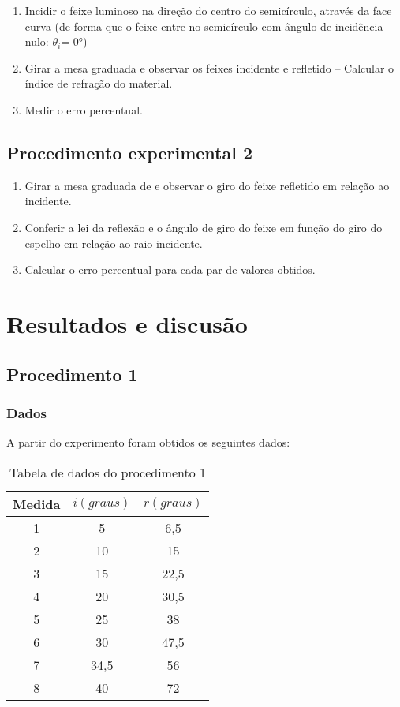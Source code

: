 \documentclass [a4paper, 12pt]{article}
\begin{document}
\begin{enumerate}
    \item Incidir o feixe luminoso na direção do centro do semicírculo, através da face curva (de forma que o feixe entre no semicírculo com ângulo de incidência nulo: $\theta_{i}$= 0°)
    \item Girar a mesa graduada e observar os feixes incidente e refletido – Calcular o índice de refração do material.
    \item Medir o erro percentual.
\end{enumerate}

\subsection{Procedimento experimental 2}

\begin{enumerate}
    \item Girar a mesa graduada de e observar o giro do feixe refletido em relação ao incidente.
    \item Conferir a lei da reflexão e o ângulo de giro do feixe em função do giro do espelho em relação ao raio incidente.
    \item Calcular o erro percentual para cada par de valores obtidos.
\end{enumerate}

\section{Resultados e discusão}

\subsection{Procedimento 1}

\subsubsection{Dados}

A partir do experimento foram obtidos os seguintes dados:

\begin{table}[h]
\centering
\caption{Tabela de dados do procedimento 1}
\vspace{0.5cm}
\begin{tabular}{|c|c|c|} \hline
Medida & $i(graus)$ & $r(graus)$  \\ %
\hline                               %
1   &   5    &   6,5     \\  \hline
2   &   10   &   15      \\  \hline
3   &   15   &   22,5    \\  \hline
4   &   20   &   30,5    \\  \hline
5   &   25   &   38      \\  \hline
6   &   30   &   47,5    \\  \hline
7   &   34,5 &   56      \\  \hline
8   &   40   &   72      \\  \hline
\end{tabular}
\end{table}
\end{document}
